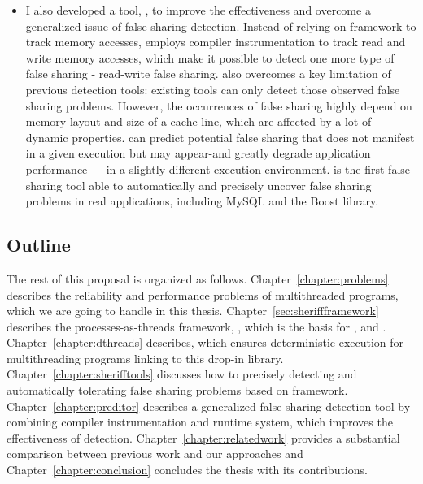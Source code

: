 \begin{itemize}
\item I also developed a tool, \predator{}, to improve the effectiveness and overcome a generalized issue of false sharing detection. Instead of relying on \sheriff{} framework to track memory accesses, \predator{} employs compiler instrumentation to track read and write memory accesses, which make it possible to detect one more type of false sharing - read-write false sharing. \Predator{} also overcomes a key limitation of previous detection tools: existing tools can only detect those observed false sharing problems. However, the occurrences of false sharing highly depend on memory layout and size of a cache line, which are affected by a lot of dynamic properties. \Predator{} can predict potential false sharing that does not manifest in a given execution but may appear-and greatly degrade application performance — in a slightly different execution environment. \Predator is the first false sharing tool able to automatically and precisely uncover false sharing problems in real applications, including MySQL and the Boost library.


\end{itemize}

\subsection*{Outline}
The rest of this proposal is organized as follows. Chapter~\ref{chapter:problems} describes the reliability and performance problems of multithreaded programs, which we are going to handle in this thesis. Chapter~\ref{sec:sheriffframework} describes the processes-as-threads framework, \sheriff{}, which is the basis for \dthreads{}, \SheriffDetect{} and \SheriffProtect{}. Chapter~\ref{chapter:dthreads} describes\dthreads{}, which ensures deterministic execution for multithreading programs linking to this drop-in library. Chapter~\ref{chapter:sherifftools} discusses how to precisely detecting and automatically tolerating false sharing problems based on \sheriff{} framework. Chapter~\ref{chapter:preditor} describes a generalized false sharing detection tool by combining compiler instrumentation and runtime system, which improves the effectiveness of detection. 
Chapter~\ref{chapter:relatedwork} provides a substantial comparison between previous work and our approaches and Chapter~\ref{chapter:conclusion} concludes the thesis with its contributions. 



